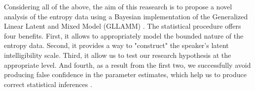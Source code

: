 \begin{comment}
	As it was suggested, several factors are proposed by the literature, but these can be largely grouped into three categories: audiology, child and environmental related factors. For the first, they are the chronological age, age at implantation, the duration of device use, `hearing' age, bilateral or contralateral cochlear implantation, and the children's preoperative and postoperative hearing levels. For the second, there is the etiology or the cause of the hearing impairment (e.g. genetic, infections), additional disabilities (e.g. mental retardation, speech motor problems), and gender. Finally for the last, there is the communication modality. 
	
	Therefore, considering the aforementioned variables, and the relation complexity with themselves and the outcome, we believe that a causal framework would allow us to integrate previous literature on the matter, and also provide a more transparent way of state and analyze our research hypothesis.
	
\end{comment}

Considering all of the above, the aim of this reasearch is to propose a novel analysis of the entropy data using a Bayesian implementation of the Generalized Linear Latent and Mixed Model (GLLAMM) \citep{Rabe_et_al_2004a, Rabe_et_al_2004b, Rabe_et_al_2004c, Rabe_et_al_2012, Skrondal_et_al_2004a}. The statistical procedure offers four benefits. First, it allows to appropriately model the bounded nature of the entropy data. Second, it provides a way to "construct" the speaker's latent intelligibility scale. Third, it allow us to test our research hypothesis at the appropriate level. And fourth, as a result from the first two, we successfully avoid producing false confidence in the parameter estimates, which help us to produce correct statistical inferences \citep{McElreath_2020}.

